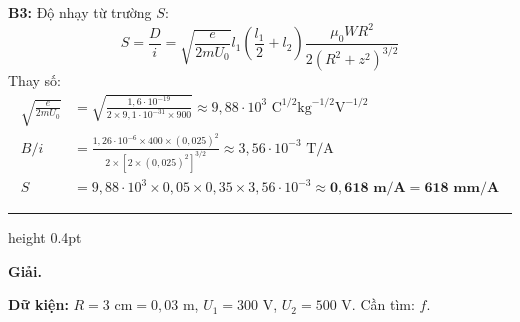 \documentclass[11pt,a4paper]{article}
\renewcommand{\boldsymbol}[1]{\symbf{#1}}
\let\DeBaiOriginal\DeBai
\renewcommand{\DeBai}[1]{\par\Needspace{5\baselineskip}\DeBaiOriginal{#1}}
\newcommand{\PhanCachBai}{%
  \par\Needspace{7\baselineskip}%
  \addvspace{6pt}%
  {\color{black!40}\hrule height 0.4pt}%
  \nobreak\vspace{7pt}\nobreak
}
\begin{document}
\textbf{B3:} Độ nhạy từ trường $S$:
\begin{equation*}
    S = \frac{D}{i} = \sqrt{\frac{e}{2 m U_0}} l_1 \left(\frac{l_1}{2} + l_2\right) \frac{\mu_0 W R^2}{2(R^2+z^2)^{3/2}}
\end{equation*}
Thay số:
\begin{align*}
    \sqrt{\frac{e}{2 m U_0}} &= \sqrt{\frac{1{,}6 \cdot 10^{-19}}{2 \times 9{,}1 \cdot 10^{-31} \times 900}} \approx 9{,}88 \cdot 10^3\text{ C}^{1/2}\text{kg}^{-1/2}\text{V}^{-1/2} \\
    B/i &= \frac{1{,}26 \cdot 10^{-6} \times 400 \times (0{,}025)^2}{2 \times [2 \times (0{,}025)^2]^{3/2}} \approx 3{,}56 \cdot 10^{-3}\text{ T/A} \\
    S &= 9{,}88 \cdot 10^3 \times 0{,}05 \times 0{,}35 \times 3{,}56 \cdot 10^{-3} \approx \boldsymbol{0{,}618\text{ m/A}} = \boldsymbol{618\text{ mm/A}}
\end{align*}

\PhanCachBai


\textbf{Giải.}

\textbf{Dữ kiện:} $R = 3\text{ cm} = 0{,}03\text{ m}$, $U_1 = 300\text{ V}$, $U_2 = 500\text{ V}$. Cần tìm: $f$.
\end{document}
